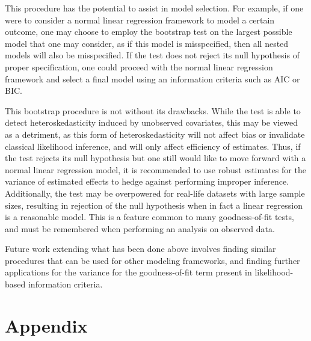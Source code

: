 \documentclass[12pt]{article} %
\theoremstyle{definition}
\begin{document}
This procedure has the potential to assist in model selection. For example, if one were to consider a normal linear regression framework to model a certain outcome, one may
choose to employ the bootstrap test on the largest possible model that one may consider, as if this model is misspecified, then all nested models will also be misspecified.
If the test does not reject its null hypothesis of proper specification, one could proceed with the normal linear regression framework and select a final model using
an information criteria such as AIC or BIC.

This bootstrap procedure is not without its drawbacks. While the test is able to detect heteroskedasticity induced by unobserved covariates, this may be viewed as a detriment,
as this form of heteroskedasticity will not affect bias or invalidate classical likelihood inference, and will only affect efficiency of estimates. Thus, if the test rejects its
null hypothesis but one still would like  to move forward with a normal linear regression model, it is recommended to use robust estimates for the variance of estimated effects
to hedge against performing improper inference. Additionally, the test may be overpowered for real-life datasets with large sample sizes, resulting in rejection of the null hypothesis
when in fact a linear regression is a reasonable model. This is a feature common to many goodness-of-fit tests, and must be remembered when performing an analysis on observed data.

Future work extending what has been done above involves finding similar procedures that can be used for other modeling frameworks, and finding further applications for the variance for
the goodness-of-fit term present in likelihood-based information criteria.



\section*{Appendix}
\end{document}
